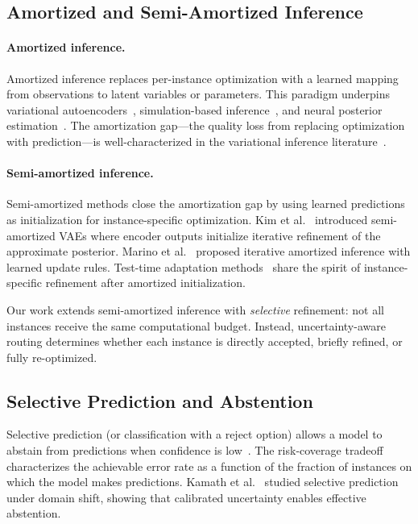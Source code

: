 \documentclass[11pt,a4paper]{article}
\begin{document}
\subsection{Amortized and Semi-Amortized Inference}

\paragraph{Amortized inference.}
Amortized inference replaces per-instance optimization with a learned mapping
from observations to latent variables or parameters.
This paradigm underpins variational autoencoders~\cite{kingma2014auto},
simulation-based inference~\cite{cranmer2020frontier},
and neural posterior estimation~\cite{papamakarios2019sequential}.
The amortization gap---the quality loss from replacing optimization with
prediction---is well-characterized in the variational inference
literature~\cite{amos2023tutorial}.

\paragraph{Semi-amortized inference.}
Semi-amortized methods close the amortization gap by using learned predictions
as initialization for instance-specific optimization.
Kim et al.~\cite{kim2018semi} introduced semi-amortized VAEs where
encoder outputs initialize iterative refinement of the approximate posterior.
Marino et al.~\cite{marino2018iterative} proposed iterative amortized inference
with learned update rules. Test-time adaptation methods~\cite{wang2020tent}
share the spirit of instance-specific refinement after amortized initialization.

Our work extends semi-amortized inference with \emph{selective} refinement:
not all instances receive the same computational budget.
Instead, uncertainty-aware routing determines whether each instance is
directly accepted, briefly refined, or fully re-optimized.

\subsection{Selective Prediction and Abstention}

Selective prediction (or classification with a reject option) allows a model
to abstain from predictions when confidence is low~\cite{geifman2017selective,shalev2010trading}.
The risk-coverage tradeoff characterizes the achievable error rate as a function
of the fraction of instances on which the model makes predictions.
Kamath et al.~\cite{kamath2020selective} studied selective prediction under
domain shift, showing that calibrated uncertainty enables effective abstention.
\end{document}
